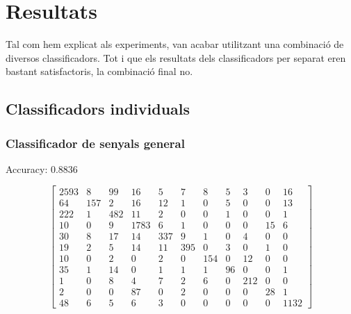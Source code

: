 

\section{Resultats}%
\label{sec:resultats}

Tal com hem explicat als experiments, van acabar utilitzant una combinació de
diversos classificadors. Tot i que els resultats dels classificadors per separat
eren bastant satisfactoris, la combinació final no.


\subsection{Classificadors individuals}

\subsubsection{Classificador de senyals general}

\setcounter{MaxMatrixCols}{43}

Accuracy: 0.8836

\begin{equation*}
\begin{bmatrix}
2593	&	8	&	99	&	16	    &	5	&	7	&	8	&	5	&	3	&	0	&	16 \\
64	    &	157	&	2	&	16	    &	12	&	1	&	0	&	5	&	0	&	0	&	13 \\
222	    &	1	&	482	&	11	    &	2	&	0	&	0	&	1	&	0	&	0	&	1 \\
10	    &	0	&	9	&	1783	&	6	&	1	&	0	&	0	&	0	&	15	&	6 \\
30	    &	8	&	17	&	14	    &	337	&	9	&	1	&	0	&	4	&	0	&	0 \\
19	    &	2	&	5	&	14	    &	11	&	395	&	0	&	3	&	0	&	1	&	0 \\
10	    &	0	&	2	&	0	    &	2	&	0	&	154	&	0	&	12	&	0	&	0 \\
35	    &	1	&	14	&	0	    &	1	&	1	&	1	&	96	&	0	&	0	&	1 \\
1	    &	0	&	8	&	4	    &	7	&	2	&	6	&	0	&	212	&	0	&	0 \\
2	    &	0	&	0	&	87	    &	0	&	2	&	0	&	0	&	0	&	28	&	1 \\
48	    &	6	&	5	&	6	    &	3	&	0	&	0	&	0	&	0	&	0	&	1132
\end{bmatrix}
\end{equation*}

